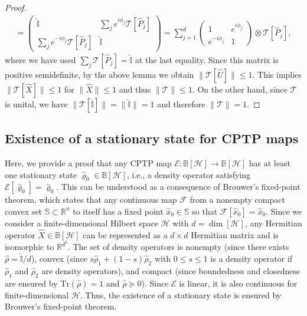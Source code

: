 \documentclass[preprint,pteplogo]{ptephy_v2}%
\numberwithin{equation}{section}
\theoremstyle{definition}
\newcommand{\mc}[1]{\mathcal{#1}}
\newcommand{\mr}[1]{\mathrm{#1}}
\newcommand{\mbb}[1]{\mathbb{#1}}
\newcommand{\Tr}{\mr{Tr}}
\begin{document}
\begin{proof}
\begin{align}
= \begin{pmatrix} \hat{\mbb{I}} & \sum_j e^{i\phi_j} \mc{T}[\hat{P}_j] \\ \sum_j e^{-i\phi_j} \mc{T}[\hat{P}_j] & \hat{\mbb{I}} \end{pmatrix}
= \sum_{j=1}^d \begin{pmatrix} 1 & e^{i\phi_j} \\ e^{-i\phi_j} & 1 \end{pmatrix} \otimes \mc{T}[\hat{P}_j],
\end{align}
where we have used $\sum_j \mc{T}[\hat{P}_j] = \hat{\mbb{I}}$ at the last equality. 
Since this matrix is positive semidefinite, by the above lemma we obtain $\lVert \mc{T}[\hat{U}] \rVert \leq 1$. 
This implies $\lVert \mc{T}[\hat{X}] \rVert \leq 1$ for $\lVert \hat{X} \rVert \leq 1$ and thus $\lVert \mc{T} \rVert \leq 1$. 
On the other hand, since $\mc{T}$ is unital, we have $\lVert \mc{T}[\hat{\mbb{I}}] \rVert = \lVert \hat{\mbb{I}} \rVert = 1$ and therefore $\lVert \mc{T} \rVert = 1$.
\end{proof}

\subsection{Existence of a stationary state for CPTP maps}
\label{app:StationaryState}

Here, we provide a proof that any CPTP map $\mc{E}: \mbb{B}[\mc{H}] \to \mbb{B}[\mc{H}]$ has at least one stationary state $\hat{\varrho}_0 \in \mbb{B}[\mc{H}]$, i.e., a density operator satisfying $\mc{E}[\hat{\varrho}_0] = \hat{\varrho}_0$.
This can be understood as a consequence of Brouwer's fixed-point theorem, which states that any continuous map $\mc{F}$ from a nonempty compact convex set $\mbb{S} \subset \mbb{R}^n$ to itself has a fixed point $\hat{x}_0 \in \mbb{S}$ so that $\mc{F}[\hat{x}_0] = \hat{x}_0$.
Since we consider a finite-dimensional Hilbert space $\mc{H}$ with $d = \dim[\mc{H}]$, any Hermitian operator $\hat{X} \in \mbb{B}[\mc{H}]$ can be represented as a $d \times d$ Hermitian matrix and is isomorphic to $\mbb{R}^{d^2}$.
The set of density operators is nonempty (since there exists $\hat{\rho}=\hat{\mbb{I}}/d$), convex (since $s \hat{\rho}_1 + (1-s) \hat{\rho}_2$ with $0 \leq s \leq 1$ is a density operator if $\hat{\rho}_1$ and $\hat{\rho}_2$ are density operators), and compact (since boundedness and closedness are ensured by $\Tr(\hat{\rho})=1$ and $\hat{\rho} \succeq 0$).
Since $\mc{E}$ is linear, it is also continuous for finite-dimensional $\mc{H}$.
Thus, the existence of a stationary state is ensured by Brouwer's fixed-point theorem.
\end{document}

